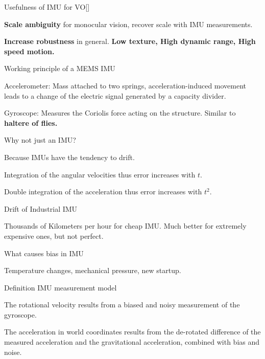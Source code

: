 \documentclass[10pt,a4paper]{scrartcl}
\begin{document}
\begin{multicols*}{2}
\begin{QandA}{Usefulness of IMU for VO}[\Application]
\item \textbf{Scale ambiguity} for monocular vision, recover scale with IMU measurements.
\item \textbf{Increase robustness} in general. \textbf{Low texture, High dynamic range, High speed motion.}
\end{QandA}

\begin{QandA}
{Working principle of a MEMS IMU}
\item Accelerometer: Mass attached to two springs, acceleration-induced movement leads to a change of the electric signal generated by a capacity divider.
\item Gyroscope: Measures the Coriolis force acting on the structure. Similar to \textbf{haltere of flies.}
\end{QandA}

\begin{QandA}{Why not just an IMU?}
\item Because IMUs have the tendency to drift.
\item Integration of the angular velocities thus error increases with $t$.
\item Double integration of the acceleration thus error increases with $t^2$.
\end{QandA}

\begin{QandA}
{Drift of Industrial IMU}
\item Thousands of Kilometers per hour for cheap IMU. Much better for extremely expensive ones, but not perfect.
\end{QandA}

\begin{QandA}
{What causes bias in IMU}
\item Temperature changes, mechanical pressure, new startup.
\end{QandA}

\begin{QandA}
{Definition IMU measurement model}
\item The rotational velocity results from a biased and noisy measurement of the gyroscope.
\item The acceleration in world coordinates results from the de-rotated difference of the measured acceleration and the gravitational acceleration, combined with bias and noise.
\end{QandA}


\end{multicols*}
\end{document}
